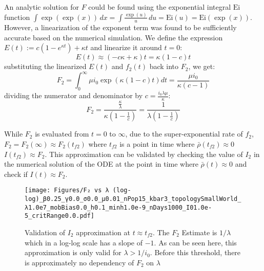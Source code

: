 An analytic solution for $F$ could be found using the exponential integral $\mathrm{Ei}$ function  $\int\exp(\exp(x))\,d x=\int{\frac{\exp(u)}{u}}\,d u={\mathrm{Ei}}(u)={\mathrm{Ei}}(\exp(x))$. However, a linearization of the exponent term was found to be sufficiently accurate based on the numerical simulation. We define the expression $E(t):=c\left( 1 - e^{\kappa t} \right)+\kappa t$ and linearize it around $t=0$: 
\begin{equation}E(t)\approx (-c\kappa+\kappa)t = \kappa (1-c) t\end{equation}
substituting the linearized $E(t)$ and $f_2(t)$ back into $F_2$, we get:
\begin{equation}F_2=\int_0^\infty \mu i_0 \exp\left(\kappa (1-c) t \right) dt = \frac{\mu i_0}{\kappa(c-1)}\end{equation}
dividing the numerator and denominator by $c=\frac{i_{0} \lambda \mu}{\kappa}$:
\begin{equation}
F_2=\frac{\frac{\kappa}{\lambda}}{\kappa\left( 1-\frac{1}{c} \right)}=\frac{1}{\lambda\left( 1-\frac{1}{c} \right)}
\end{equation}

While $F_2$ is evaluated from $t=0$ to $\infty$, due to the super-exponential rate of $f_2$, $F_2=F_2(\infty)\approx F_2(t_{f2})$ where $t_{f2}$ is a point in time where $\bar\rho(t_{f2})\approx 0$  $I({t_{f2}})\approx F_2$. This approximation can be validated by checking the value of $I_2$ in the numerical solution of the ODE at the point in time where $\bar\rho(t)\approx 0$ and check if $I(t)\approx F_2$. 

\begin{figure}[!ht]
    \centering
    \texttt{[image: Figures/F₂ vs λ (log-log)\_β0.25\_γ0.0\_σ0.0\_μ0.01\_nPop15\_kbar3\_topologySmallWorld\_λ1.0e7\_mobBias0.0\_h0.1\_minh1.0e-9\_nDays1000\_I01.0e-5\_critRange0.0.pdf]}
    \caption{\small Validation of $I_2$ approximation at $t \approx t_{f2}$. The $F_2$ Estimate is $1/\lambda$ which in a log-log scale has a slope of $-1$. As can be seen here, this approximation is only valid for $\lambda>1/i_0$. Before this threshold, there is approximately no dependency of $F_2$ on $\lambda$ }

\end{figure}

